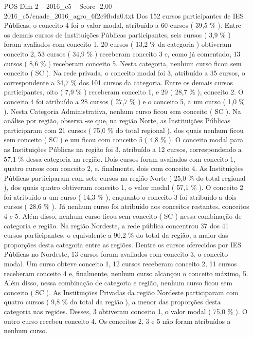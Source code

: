 \begin{textsample}{POS Dim 2 – 2016\_c5 – Score -2.00 – 2016\_c5/enade\_2016\_agro\_6f2e9fbda0.txt}
Dos 152 cursos participantes de IES Públicas, o conceito 4 foi o valor modal, atribuído a 60 cursos ( 39,5 \% ).
Entre os demais cursos de Instituições Públicas participantes, seis cursos ( 3,9 \% ) foram avaliados com conceito 1, 20 cursos ( 13,2 \% da categoria ) obtiveram conceito 2, 53 cursos ( 34,9 \% ) receberam conceito 3 e, como já comentado, 13 cursos ( 8,6 \% ) receberam conceito 5.
Nesta categoria, nenhum curso ficou sem conceito ( SC ).
Na rede privada, o conceito modal foi 3, atribuído a 35 cursos, o correspondente a 34,7 \% dos 101 cursos da categoria.
Entre os demais cursos participantes, oito ( 7,9 \% ) receberam conceito 1, e 29 ( 28,7 \% ), conceito 2.
O conceito 4 foi atribuído a 28 cursos ( 27,7 \% ) e o conceito 5, a um curso ( 1,0 \% ).
Nesta Categoria Administrativa, nenhum curso ficou sem conceito ( SC ).
Na análise por região, observa -se que, na região Norte, as Instituições Públicas participaram com 21 cursos ( 75,0 \% do total regional ), dos quais nenhum ficou sem conceito ( SC ) e um ficou com conceito 5 ( 4,8 \% ).
O conceito modal para as Instituições Públicas na região foi 3, atribuído a 12 cursos, correspondendo a 57,1 \% dessa categoria na região.
Dois cursos foram avaliados com conceito 1, quatro cursos com conceito 2, e, finalmente, dois com conceito 4.
As Instituições Públicas participaram com sete cursos na região Norte ( 25,0 \% do total regional ), dos quais quatro obtiveram conceito 1, o valor modal ( 57,1 \% ).
O conceito 2 foi atribuído a um curso ( 14,3 \% ), enquanto o conceito 3 foi atribuído a dois cursos ( 28,6 \% ).
Já nenhum curso foi atribuído aos conceitos restantes, conceitos 4 e 5.
Além disso, nenhum curso ficou sem conceito ( SC ) nessa combinação de categoria e região.
Na região Nordeste, a rede pública concentrou 37 dos 41 cursos participantes, o equivalente a 90,2 \% do total da região, a maior das proporções desta categoria entre as regiões.
Dentre os cursos oferecidos por IES Públicas no Nordeste, 13 cursos foram avaliados com conceito 3, o conceito modal.
Um curso obteve conceito 1, 12 cursos receberam conceito 2, 11 cursos receberam conceito 4 e, finalmente, nenhum curso alcançou o conceito máximo, 5.
Além disso, nessa combinação de categoria e região, nenhum curso ficou sem conceito ( SC ).
As Instituições Privadas da região Nordeste participaram com quatro cursos ( 9,8 \% do total da região ), a menor das proporções desta categoria nas regiões.
Desses, 3 obtiveram conceito 1, o valor modal ( 75,0 \% ).
O outro curso recebeu conceito 4.
Os conceitos 2, 3 e 5 não foram atribuídos a nenhum curso.

\end{textsample}
